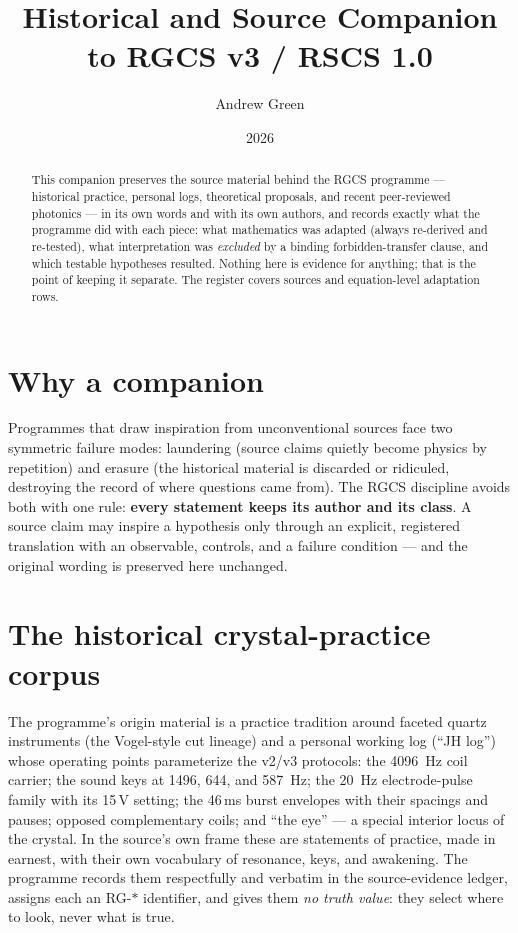 \documentclass[10pt,letterpaper]{article}
\title{\vspace{-2.0em}\textbf{Historical and Source Companion\\
to RGCS v3 / RSCS 1.0}}
\author{Andrew Green}
\date{2026}
\begin{document}
\maketitle

\begin{abstract}
This companion preserves the source material behind the RGCS programme
--- historical practice, personal logs, theoretical proposals, and recent
peer-reviewed photonics --- in its own words and with its own authors,
and records exactly what the programme did with each piece: what
mathematics was adapted (always re-derived and re-tested), what
interpretation was \emph{excluded} by a binding forbidden-transfer
clause, and which testable hypotheses resulted. Nothing here is evidence
for anything; that is the point of keeping it separate. The register
covers \gvNumSources{} sources and \gvNumEp{} equation-level adaptation
rows.
\end{abstract}

\section{Why a companion}
Programmes that draw inspiration from unconventional sources face two
symmetric failure modes: laundering (source claims quietly become
physics by repetition) and erasure (the historical material is discarded
or ridiculed, destroying the record of where questions came from). The
RGCS discipline avoids both with one rule: \textbf{every statement keeps
its author and its class}. A source claim \SRC{} may inspire a
hypothesis \HYP{} only through an explicit, registered translation with
an observable, controls, and a failure condition --- and the original
wording is preserved here unchanged.

\section{The historical crystal-practice corpus \SRC}
The programme's origin material is a practice tradition around faceted
quartz instruments (the Vogel-style cut lineage) and a personal
working log (``JH log'') whose operating points parameterize the v2/v3
protocols: the \SI{4096}{\hertz} coil carrier; the sound keys at 1496,
644, and \SI{587}{\hertz}; the \SI{20}{\hertz} electrode-pulse family
with its 15\,V setting; the 46\,ms burst envelopes with their spacings
and pauses; opposed complementary coils; and ``the eye'' --- a special
interior locus of the crystal. In the source's own frame these are
statements of practice, made in earnest, with their own vocabulary of
resonance, keys, and awakening. The programme records them respectfully
and verbatim in the source-evidence ledger, assigns each an RG-$\ast$
identifier, and gives them \emph{no truth value}: they select where to
look, never what is true.
\end{document}
